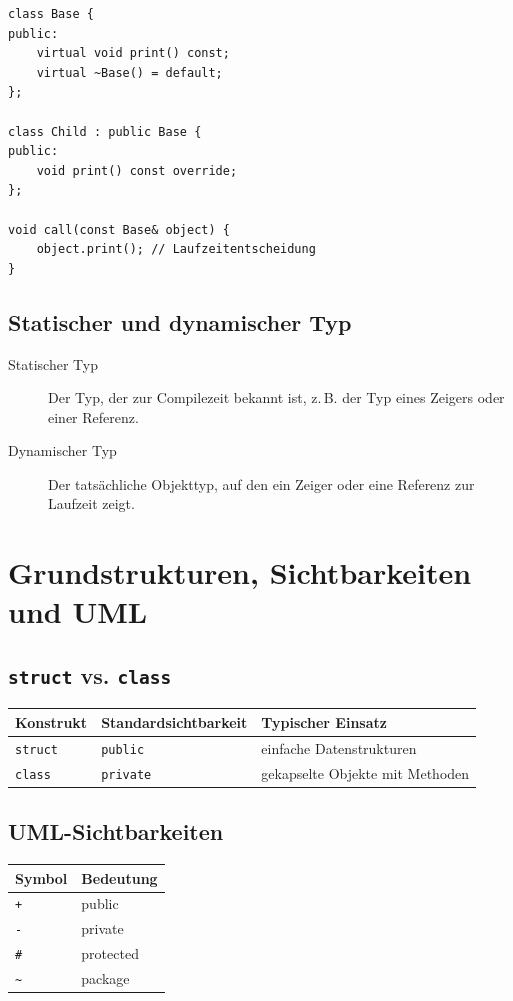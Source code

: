 \documentclass[11pt,a4paper]{article}
\newcommand{\code}[1]{\texttt{#1}}
\begin{document}
\begin{lstlisting}[caption={Dynamische Polymorphie mit virtueller Funktion}]
class Base {
public:
    virtual void print() const;
    virtual ~Base() = default;
};

class Child : public Base {
public:
    void print() const override;
};

void call(const Base& object) {
    object.print(); // Laufzeitentscheidung
}
\end{lstlisting}

\subsection{Statischer und dynamischer Typ}
\begin{description}
  \item[Statischer Typ] Der Typ, der zur Compilezeit bekannt ist, z.\,B. der Typ eines Zeigers oder einer Referenz.
  \item[Dynamischer Typ] Der tatsächliche Objekttyp, auf den ein Zeiger oder eine Referenz zur Laufzeit zeigt.
\end{description}

\section{Grundstrukturen, Sichtbarkeiten und UML}

\subsection{\code{struct} vs. \code{class}}
\begin{center}
\begin{tabular}{lll}
\toprule
Konstrukt & Standardsichtbarkeit & Typischer Einsatz \\
\midrule
\code{struct} & \code{public} & einfache Datenstrukturen \\
\code{class} & \code{private} & gekapselte Objekte mit Methoden \\
\bottomrule
\end{tabular}
\end{center}

\subsection{UML-Sichtbarkeiten}
\begin{center}
\begin{tabular}{ll}
\toprule
Symbol & Bedeutung \\
\midrule
\code{+} & public \\
\code{-} & private \\
\code{\#} & protected \\
\code{\textasciitilde} & package \\
\bottomrule
\end{tabular}
\end{center}
\end{document}
